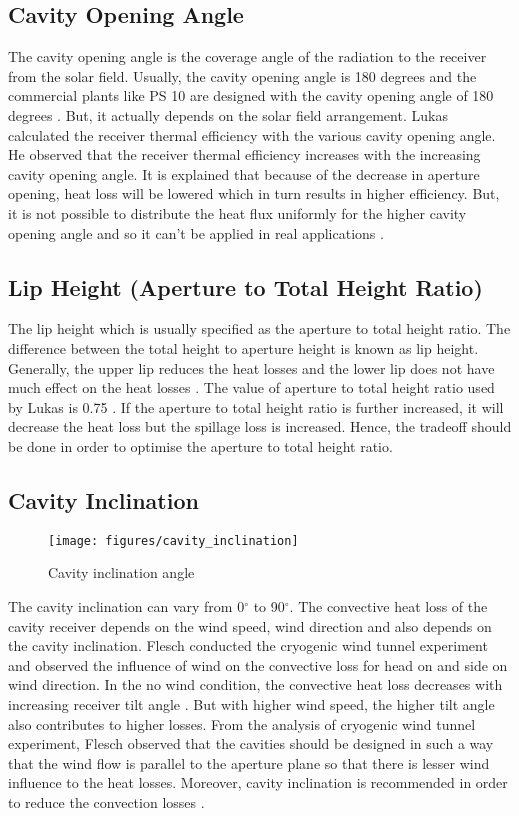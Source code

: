 \subsection{Cavity Opening Angle}
The cavity opening angle is the coverage angle of the radiation to the receiver from the solar field. Usually, the cavity opening angle is 180 degrees and the commercial plants like PS 10 are designed with the cavity opening angle of 180 degrees \cite{Feierabend.2010}. But, it actually depends on the solar field arrangement. Lukas \cite{Feierabend.2010} calculated the receiver thermal efficiency with the various cavity opening angle. He observed that the receiver thermal efficiency increases with the increasing cavity opening angle. It is explained that because of the decrease in aperture opening, heat loss will be lowered which in turn results in higher efficiency. But, it is not possible to distribute the heat flux uniformly for the higher cavity opening angle and so it can't be applied in real applications \cite{Feierabend.2010}.
\subsection{Lip Height (Aperture to Total Height Ratio) } 
The lip height which is usually specified as the aperture to total height ratio. The difference between the total height to aperture height is known as lip height. Generally, the upper lip reduces the heat losses and the lower lip does not have much effect on the heat losses \cite{Kraabel.1983}. The value of aperture to total height ratio used by Lukas is 0.75 \cite{Feierabend.2010}. If the aperture to total height ratio is further increased, it will decrease the heat loss but the spillage loss is increased. Hence, the tradeoff should be done in order to optimise the aperture to total height ratio.
\subsection{Cavity Inclination}
\begin{figure}[h]
	\texttt{[image: figures/cavity\_inclination]}
	\centering
	\caption{Cavity inclination angle \cite{Ma.1993}}	
\end{figure}
The cavity inclination can vary from 0${^\circ}$ to 90${^\circ}$. The convective heat loss of the cavity receiver depends on the wind speed, wind direction and also depends on the cavity inclination. Flesch \cite{Flesch.2015} conducted the cryogenic wind tunnel experiment and observed the influence of wind on the convective loss for head on and side on wind direction. In the no wind condition, the convective heat loss decreases with increasing receiver tilt angle\cite{Clausing.1981} \cite{Clausing.1983}. But with higher wind speed, the higher tilt angle also contributes to higher losses. From the analysis of cryogenic wind tunnel experiment, Flesch \cite{Flesch.2015} observed that the cavities should be designed in such a way that the wind flow is parallel to the aperture plane so that there is lesser wind influence to the heat losses. Moreover, cavity inclination is recommended in order to reduce the convection losses \cite{Flesch.2015}. 
